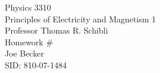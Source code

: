 \begin{titlepage}
\setlength{\topmargin}{1.5in}
\begin{center}
\Huge{Physics 3310} \\
\LARGE{Principles of Electricity and Magnetism 1} \\
\Large{Professor Thomas R. Schibli} \\[1cm]

\huge{Homework \#\HWnum}\\[0.5cm]

\large{Joe Becker} \\
\large{SID: 810-07-1484} \\
\large{\due} 

\end{center}

\end{titlepage}

